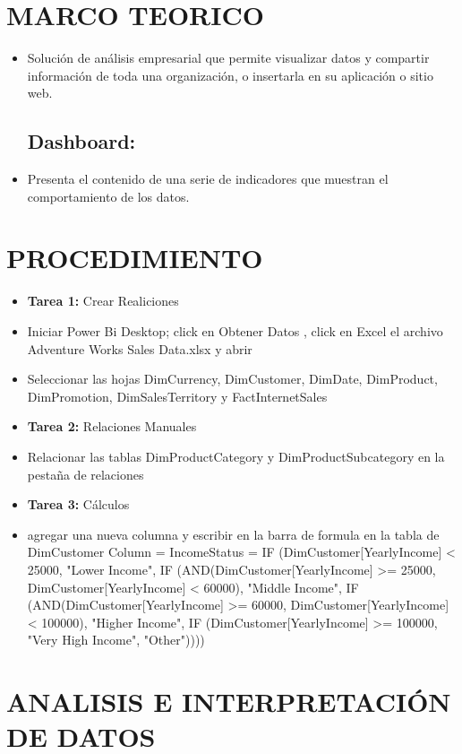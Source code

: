 \documentclass[12pt,letterpaper]{article}
\begin{document}
\section{MARCO TEORICO}
\begin{itemize}
\subsection{Power Bi:}
	\item Solución de análisis empresarial que permite visualizar datos y compartir información de toda una organización, o insertarla en su aplicación o sitio web. 
\subsection{Dashboard:}
	\item Presenta el contenido de una serie de indicadores que muestran el comportamiento de los datos. 
\end{itemize}
\section{PROCEDIMIENTO}
\begin{itemize}
	\item \textbf{Tarea 1:} Crear Realiciones 
	\item Iniciar Power Bi Desktop; click en Obtener Datos , click en Excel el archivo Adventure Works Sales Data.xlsx y abrir
	\item  Seleccionar las hojas DimCurrency, DimCustomer, DimDate, DimProduct, DimPromotion, DimSalesTerritory y FactInternetSales
	\item \textbf{Tarea 2:} Relaciones Manuales
	\item Relacionar las tablas DimProductCategory y DimProductSubcategory en la pestaña de relaciones
	\item \textbf{Tarea 3:} Cálculos
	\item agregar una nueva columna y escribir en la barra de formula en la tabla de DimCustomer Column = IncomeStatus = IF (DimCustomer[YearlyIncome] < 25000, "Lower Income",
IF (AND(DimCustomer[YearlyIncome] >= 25000, DimCustomer[YearlyIncome] < 60000),
"Middle Income",
IF (AND(DimCustomer[YearlyIncome] >= 60000, DimCustomer[YearlyIncome] < 100000),
"Higher Income",
IF (DimCustomer[YearlyIncome] >= 100000, "Very High Income", "Other"))))
\end{itemize}
\section{ANALISIS E INTERPRETACIÓN DE DATOS}
\end{document}
